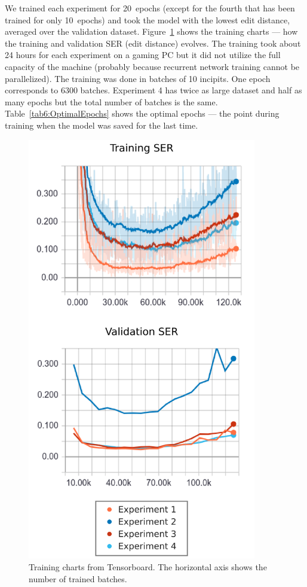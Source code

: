We trained each experiment for 20~epochs (except for the fourth that has been trained for only 10~epochs) and took the model with the lowest edit distance, averaged over the validation dataset. Figure~\ref{fig6:TrainingCharts} shows the training charts --- how the training and validation SER (edit distance) evolves. The training took about 24 hours for each experiment on a gaming PC but it did not utilize the full capacity of the machine (probably because recurrent network training cannot be parallelized). The training was done in batches of 10 incipits. One epoch corresponds to 6300 batches. Experiment 4 has twice as large dataset and half as many epochs but the total number of batches is the same. Table~\ref{tab6:OptimalEpochs} shows the optimal epochs --- the point during training when the model was saved for the last time.

\begin{figure}[p]
    \centering
    \includegraphics[width=100mm]{../img/training-charts}
    \caption{Training charts from Tensorboard. The horizontal axis shows the number of trained batches.}
    \label{fig6:TrainingCharts}
\end{figure}


